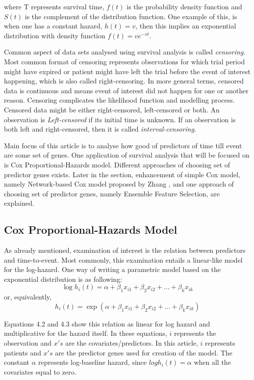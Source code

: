 \documentclass{ba-kecs}
\numberwithin{figure}{section}
\numberwithin{equation}{section}
\begin{document}
where T represents survival time, $f(t)$ is the probability density function and $S(t)$ is the complement of the distribution function. One example of this, is when one has a constant hazard, $h(t) = v$, then this implies an exponential distribution with density function $f(t) = ve^{-vt}$.

Common aspect of data sets analysed using survival analysis is called \textit{censoring}. Most common format of censoring represents observations for which trial period might have expired or patient might have left the trial before the event of interest happening, which is also called right-censoring. In more general terms, censored data is continuous and means event of interest did not happen for one or another reason. Censoring complicates the likelihood function and modelling process. Censored data might be either right-censored, left-censored or both. An observation is \textit{Left-censored} if its initial time is unknown. If an observation is both left and right-censored, then it is called \textit{interval-censoring}.

Main focus of this article is to analyse how good of predictors of time till event are some set of genes. One application of survival analysis that will be focused on is Cox Proportional-Hazards model. Different approaches of choosing set of predictor genes exists. Later in the section, enhancement of simple Cox model, namely Network-based Cox model proposed by Zhang \cite{netcox}, and one approach of choosing set of predictor genes, namely Ensemble Feature Selection, are explained.

\subsection{Cox Proportional-Hazards Model}
As already mentioned, examination of interest is the relation between predictors and time-to-event. Most commonly, this examination entails a linear-like model for the log-hazard. One way of writing a parametric model based on the exponential distribution is as following:
\begin{equation}
\log{h_{i}(t)} = \alpha + \beta_{1}x_{i1} + \beta_{2}x_{i2} + \hdots + \beta_{k}x_{ik}
\end{equation}
or, equivalently,
\begin{equation}
h_i(t) = \exp(\alpha + \beta_{1}x_{i1} + \beta_{2}x_{i2} + \hdots + \beta_{k}x_{ik})
\end{equation}

Equations 4.2 and 4.3 show this relation as linear for log hazard and multiplicative for the hazard itself. In these equations, $i$ represents the observation and $x's$ are the covariates/predictors. In this article, $i$ represents patients and $x's$ are the predictor genes used for creation of the model. The constant $\alpha$ represents log-baseline hazard, since $log{h_i(t)} = \alpha$ when all the covariates equal to zero. 
\end{document}
